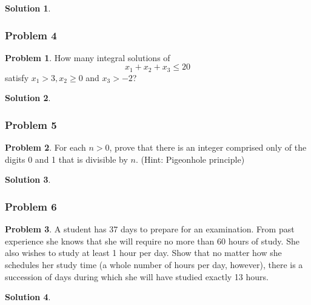 \documentclass[10pt,a4paper,titlepage,twoside,draft]{article}
\theoremstyle{plain}
\theoremstyle{definition}
\newtheorem*{prob}{Problem}
\newtheorem*{sol}{Solution}
\theoremstyle{remark}
\begin{document}
\begin{sol}
    
\end{sol}
    

\subsubsection{Problem 4}

\begin{prob}
    How many integral solutions of
    $$ x_1 + x_2 + x_3  \leq 20 $$
    satisfy $x_1 > 3, x_2 \geq 0$ and $x_3 > -2$?
\end{prob}
    
\medskip
    
\begin{sol}  
    
\end{sol}


\subsubsection{Problem 5}

\begin{prob}
    For each $n > 0$, prove that there is an integer comprised only of the digits 0 and 1 that is divisible by $n$.
    (Hint: Pigeonhole principle)
\end{prob}

\medskip
    
\begin{sol}
    
\end{sol}
    
    
\subsubsection{Problem 6}

\begin{prob}
    A student has 37 days to prepare for an examination. From past experience she knows that she will require no more than 60 hours of study. She also wishes to study at least 1 hour per day. Show that no matter how she schedules her study time (a whole number of hours per day, however), there is a succession of days during which she will have studied exactly 13 hours.
\end{prob}

\medskip

\begin{sol}
    
\end{sol}
    
\end{document}

